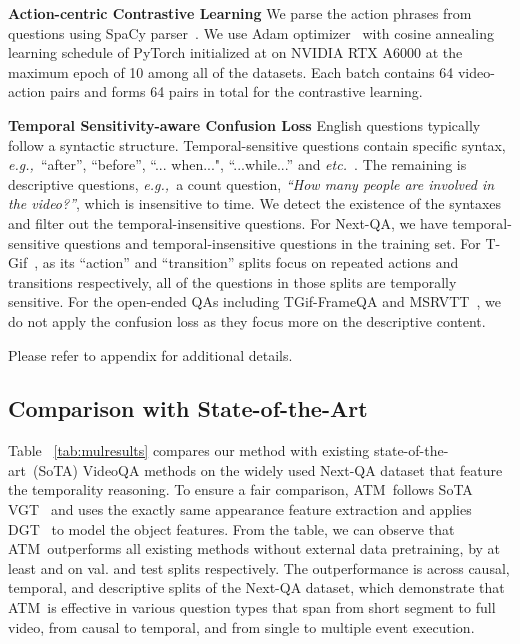 \documentclass[sigconf]{acmart}
\newcommand{\methodname}{ATM~}
\newcommand{\eg}{\emph{e.g.,~}}
\newcommand{\etc}{\emph{etc.~}}
\begin{document}
\textbf{Action-centric Contrastive Learning}
We parse the action phrases from questions using SpaCy parser~\cite{spacy2}.
We use Adam optimizer~\cite{kingma2014adam} with cosine annealing learning schedule of PyTorch initialized at  on NVIDIA RTX A6000 at the maximum epoch of 10 among all of the datasets. 
Each batch contains 64 video-action pairs and forms 64 pairs in total for the contrastive learning. 


\textbf{Temporal Sensitivity-aware Confusion Loss}
English questions typically follow a syntactic structure. Temporal-sensitive questions contain specific syntax, \eg ``after'', ``before'', ``... when...", ``...while...'' and \etc. The remaining is descriptive questions, \eg a count question, \textit{``How many people are involved in the video?''}, which is insensitive to time. 
We detect the existence of the syntaxes and filter out the temporal-insensitive questions. 
For Next-QA, we have  temporal-sensitive questions and  temporal-insensitive questions in the training set.
For T-Gif~\cite{li2016tgif}, as its ``action'' and ``transition'' splits focus on repeated actions and transitions respectively, all of the questions in those splits are temporally sensitive. 
For the open-ended QAs including TGif-FrameQA and MSRVTT~\cite{xu2016msr}, we do not apply the confusion loss as they focus more on the descriptive content. 

Please refer to appendix for additional details.



\subsection{Comparison with State-of-the-Art}
Table ~\ref{tab:mulresults} compares our method with existing state-of-the-art~(SoTA) VideoQA methods on the widely used Next-QA dataset that feature the temporality reasoning. 
To ensure a fair comparison, \methodname follows SoTA VGT~\cite{xiao2022vgt} and uses the exactly same appearance feature extraction and applies DGT~\cite{xiao2022vgt} to model the object features. 
From the table, we can observe that \methodname outperforms all existing methods without external data pretraining, by at least  and  on val. and test splits respectively. The outperformance is across causal, temporal, and descriptive splits of the Next-QA dataset, which demonstrate that \methodname is effective in various question types that span from short segment to full video, from causal to temporal, and from single to multiple event execution. 
\end{document}

